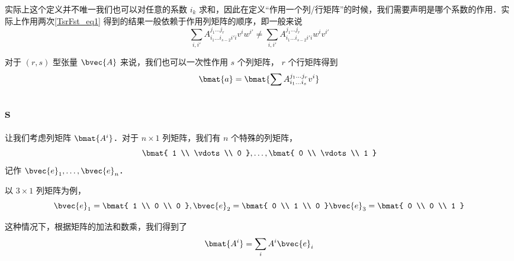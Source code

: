 实际上这个定义并不唯一我们也可以对任意的系数 $i_k$ 求和，因此在定义“作用一个列/行矩阵”的时候，我们需要声明是哪个系数的作用．实际上作用两次\autoref{TsrFst_eq1} 得到的结果一般依赖于作用列矩阵的顺序，即一般来说
$$
\sum_{i, i'} A_{i_1 \dots i_{s - 2} i' i}^{j_1 \dots j_r} v^{i} w^{i'} \neq \sum_{i, i'} A_{i_1 \dots i_{s - 2} i' i}^{j_1 \dots j_r} w^{i} v^{i'}
$$

对于 $(r, s)$ 型张量 $\bvec{A}$ 来说，我们也可以一次性作用 $s$ 个列矩阵， $r$ 个行矩阵得到
$$
\bmat{a} = \bmat{\sum A_{i_1 \dots i_s}^{j_1 \dots j_r} v^{i}}
$$

\subsection{s}
让我们考虑列矩阵 $\bmat{A^i}$．对于 $n \times 1$ 列矩阵，我们有 $n$ 个特殊的列矩阵，
$$
\bmat{
1 \\
\vdots \\
0
}, \dots,
\bmat{
0 \\
\vdots \\
1
}
$$
记作 $\bvec{e}_1, \dots, \bvec{e}_n$．

以 $3 \times 1$ 列矩阵为例，
$$
\bvec{e}_1 = \bmat{
1 \\
0 \\
0
},
\bvec{e}_2 = \bmat{
0 \\
1 \\
0
}
\bvec{e}_3 = \bmat{
0 \\
0 \\
1
}
$$

这种情况下，根据矩阵的加法和数乘，我们得到了
$$
\bmat{A^i} = \sum_i A^i \bvec{e}_i
$$


